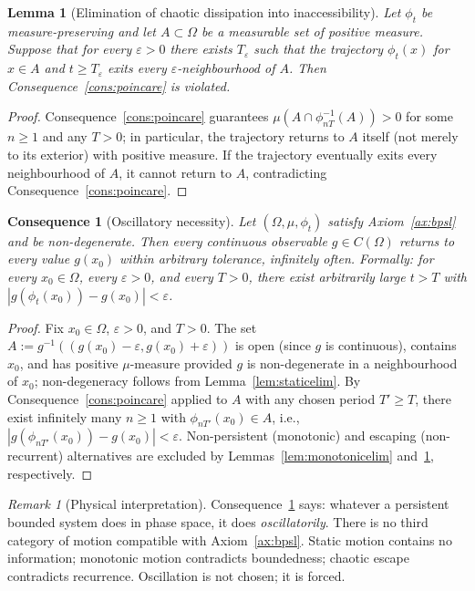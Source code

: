 \documentclass[11pt,twocolumn,a4paper]{article}
\theoremstyle{axiomstyle}
\theoremstyle{conseqstyle}
\newtheorem{consequence}{Consequence}
\newtheorem{lemma}{Lemma}
\theoremstyle{definition}
\theoremstyle{remark}
\newtheorem*{remark}{Remark}
\begin{document}
\begin{lemma}[Elimination of chaotic dissipation into inaccessibility]
\label{lem:chaoticelim}
Let $\phi_{t}$ be measure-preserving and let $A\subset\Omega$ be a measurable set of positive measure. Suppose that for every $\varepsilon>0$ there exists $T_{\varepsilon}$ such that the trajectory $\phi_{t}(x)$ for $x\in A$ and $t\ge T_{\varepsilon}$ exits every $\varepsilon$-neighbourhood of $A$. Then Consequence~\ref{cons:poincare} is violated.
\end{lemma}
\begin{proof}
Consequence~\ref{cons:poincare} guarantees $\mu(A\cap\phi_{nT}^{-1}(A))>0$ for some $n\ge 1$ and any $T>0$; in particular, the trajectory returns to $A$ itself (not merely to its exterior) with positive measure. If the trajectory eventually exits every neighbourhood of $A$, it cannot return to $A$, contradicting Consequence~\ref{cons:poincare}.
\end{proof}

\begin{consequence}[Oscillatory necessity]
\label{cons:oscillatory}
Let $(\Omega,\mu,\phi_{t})$ satisfy Axiom~\ref{ax:bpsl} and be non-degenerate. Then every continuous observable $g\in C(\Omega)$ returns to every value $g(x_{0})$ within arbitrary tolerance, infinitely often. Formally: for every $x_{0}\in\Omega$, every $\varepsilon>0$, and every $T>0$, there exist arbitrarily large $t>T$ with $|g(\phi_{t}(x_{0}))-g(x_{0})|<\varepsilon$.
\end{consequence}

\begin{proof}
Fix $x_{0}\in\Omega$, $\varepsilon>0$, and $T>0$. The set $A:=g^{-1}((g(x_{0})-\varepsilon,g(x_{0})+\varepsilon))$ is open (since $g$ is continuous), contains $x_{0}$, and has positive $\mu$-measure provided $g$ is non-degenerate in a neighbourhood of $x_{0}$; non-degeneracy follows from Lemma~\ref{lem:staticelim}. By Consequence~\ref{cons:poincare} applied to $A$ with any chosen period $T'\ge T$, there exist infinitely many $n\ge 1$ with $\phi_{nT'}(x_{0})\in A$, i.e., $|g(\phi_{nT'}(x_{0}))-g(x_{0})|<\varepsilon$. Non-persistent (monotonic) and escaping (non-recurrent) alternatives are excluded by Lemmas~\ref{lem:monotonicelim} and~\ref{lem:chaoticelim}, respectively.
\end{proof}

\begin{remark}[Physical interpretation]
Consequence~\ref{cons:oscillatory} says: whatever a persistent bounded system does in phase space, it does \emph{oscillatorily}. There is no third category of motion compatible with Axiom~\ref{ax:bpsl}. Static motion contains no information; monotonic motion contradicts boundedness; chaotic escape contradicts recurrence. Oscillation is not chosen; it is forced.
\end{remark}
\end{document}
